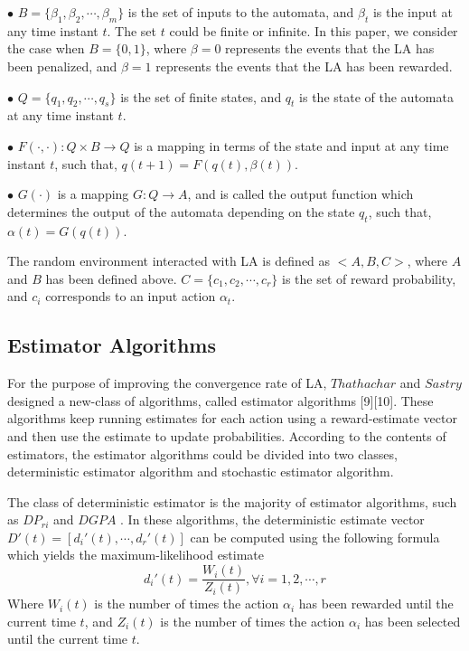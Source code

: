 $\bullet$ $B = \{ {\beta _1},{\beta _2}, \cdots ,{\beta _m}\} $ is the set of inputs to the automata, and ${\beta _t}$ is the input at any time instant $t$. The set $t$ could be finite or infinite. In this paper, we consider the case when $B = \{0,1\} $, where $\beta = 0$ represents the events that the LA has been penalized, and $\beta = 1$ represents the events that the LA has been rewarded.

$\bullet$ $Q = \{ {q_1},{q_2}, \cdots ,{q_s}\} $ is the set of finite states, and ${q_t}$ is the state of the automata at any time instant $t$.

$\bullet$ $F( \cdot , \cdot ):Q \times B \to Q$ is a mapping in terms of the state and input at any time instant $t$, such that, $q(t + 1) = F(q(t),\beta (t))$.

$\bullet$ $G( \cdot )$ is a mapping $G:Q \to A$, and is called the output function which determines the output of the automata depending on the state ${q_t}$, such that, $\alpha (t) = G(q(t))$.

The random environment interacted with LA is defined as $ < A,B,C > $, where $A$ and $B$ has been defined above. $C = \{ {c_1},{c_2}, \cdots ,{c_r}\} $ is the set of reward probability, and ${c_i}$ corresponds to an input action ${\alpha _t}$.

\subsection{Estimator Algorithms}
For the purpose of improving the convergence rate of LA, $Thathachar$ and $Sastry$ designed a new-class of algorithms, called estimator algorithms [9][10]. These algorithms keep running estimates for each action using a reward-estimate vector and then use the estimate to update probabilities. According to the contents of estimators, the estimator algorithms could be divided into two classes, deterministic estimator algorithm and stochastic estimator algorithm.

The class of deterministic estimator is the majority of estimator algorithms, such as $D{P_{ri}}$ \cite{oommen1990discretized} and $DGPA$ \cite{agache2002generalized}. In these algorithms, the deterministic estimate vector $D'(t) = [d_i'(t), \cdots ,d_r'(t)]$ can be computed using the following formula which yields the maximum-likelihood estimate \cite{sastry1985systems}\cite{thathachar1979discretized}
\begin{equation}
d_i'(t) = \frac{{{W_i}(t)}}{{{Z_i}(t)}},\forall i = 1,2, \cdots ,r
\end{equation}
Where $W_i(t)$ is the number of times the action $\alpha_i$ has been rewarded until the current time $t$, and $Z_i(t)$ is the number of times the action $\alpha_i$ has been selected until the current time $t$.

